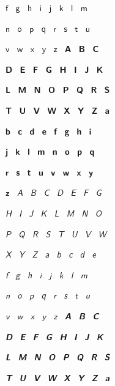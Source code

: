 \documentclass{article}
\begin{document}
$\msansf$ $\msansg$ $\msansh$ $\msansi$ $\msansj$ $\msansk$ $\msansl$ $\msansm$ \par
$\msansn$ $\msanso$ $\msansp$ $\msansq$ $\msansr$ $\msanss$ $\msanst$ $\msansu$ \par
$\msansv$ $\msansw$ $\msansx$ $\msansy$ $\msansz$ $\mbfsansA$ $\mbfsansB$ $\mbfsansC$ \par
$\mbfsansD$ $\mbfsansE$ $\mbfsansF$ $\mbfsansG$ $\mbfsansH$ $\mbfsansI$ $\mbfsansJ$ $\mbfsansK$ \par
$\mbfsansL$ $\mbfsansM$ $\mbfsansN$ $\mbfsansO$ $\mbfsansP$ $\mbfsansQ$ $\mbfsansR$ $\mbfsansS$ \par
$\mbfsansT$ $\mbfsansU$ $\mbfsansV$ $\mbfsansW$ $\mbfsansX$ $\mbfsansY$ $\mbfsansZ$ $\mbfsansa$ \par
$\mbfsansb$ $\mbfsansc$ $\mbfsansd$ $\mbfsanse$ $\mbfsansf$ $\mbfsansg$ $\mbfsansh$ $\mbfsansi$ \par
$\mbfsansj$ $\mbfsansk$ $\mbfsansl$ $\mbfsansm$ $\mbfsansn$ $\mbfsanso$ $\mbfsansp$ $\mbfsansq$ \par
$\mbfsansr$ $\mbfsanss$ $\mbfsanst$ $\mbfsansu$ $\mbfsansv$ $\mbfsansw$ $\mbfsansx$ $\mbfsansy$ \par
$\mbfsansz$ $\mitsansA$ $\mitsansB$ $\mitsansC$ $\mitsansD$ $\mitsansE$ $\mitsansF$ $\mitsansG$ \par
$\mitsansH$ $\mitsansI$ $\mitsansJ$ $\mitsansK$ $\mitsansL$ $\mitsansM$ $\mitsansN$ $\mitsansO$ \par
$\mitsansP$ $\mitsansQ$ $\mitsansR$ $\mitsansS$ $\mitsansT$ $\mitsansU$ $\mitsansV$ $\mitsansW$ \par
$\mitsansX$ $\mitsansY$ $\mitsansZ$ $\mitsansa$ $\mitsansb$ $\mitsansc$ $\mitsansd$ $\mitsanse$ \par
$\mitsansf$ $\mitsansg$ $\mitsansh$ $\mitsansi$ $\mitsansj$ $\mitsansk$ $\mitsansl$ $\mitsansm$ \par
$\mitsansn$ $\mitsanso$ $\mitsansp$ $\mitsansq$ $\mitsansr$ $\mitsanss$ $\mitsanst$ $\mitsansu$ \par
$\mitsansv$ $\mitsansw$ $\mitsansx$ $\mitsansy$ $\mitsansz$ $\mbfitsansA$ $\mbfitsansB$ $\mbfitsansC$ \par
$\mbfitsansD$ $\mbfitsansE$ $\mbfitsansF$ $\mbfitsansG$ $\mbfitsansH$ $\mbfitsansI$ $\mbfitsansJ$ $\mbfitsansK$ \par
$\mbfitsansL$ $\mbfitsansM$ $\mbfitsansN$ $\mbfitsansO$ $\mbfitsansP$ $\mbfitsansQ$ $\mbfitsansR$ $\mbfitsansS$ \par
$\mbfitsansT$ $\mbfitsansU$ $\mbfitsansV$ $\mbfitsansW$ $\mbfitsansX$ $\mbfitsansY$ $\mbfitsansZ$ $\mbfitsansa$ \par
\end{document}
